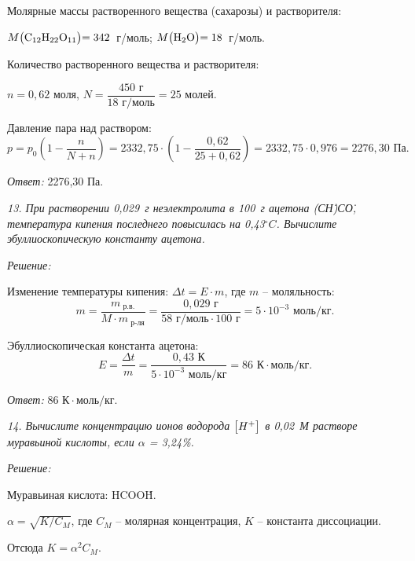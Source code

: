 Молярные массы растворенного вещества (сахарозы) и растворителя:

\( M\bigr(\mathrm{C_{12}H_{22}O_{11}}\bigl) = 342 \)~г/моль;
\( M\bigr(\mathrm{H_2O}\bigl) = 18 \)~г/моль.

Количество растворенного вещества и растворителя:

\( n = 0,\!62 \text{ моля} \), \( N = \dfrac{450\text{ г}}{18\text{ г/моль}} =
25\text{ молей} \).

Давление пара над раствором:
\[
    p = p_0\left(1 - \frac{n}{N + n}\right) = 2332,\!75\cdot\left(1 -
    \frac{0,\!62}{25 + 0,\!62}\right) = 2332,\!75\cdot 0,976 = 2276,\!30
    \text{ Па}.
\]

\vspace*{2em}
\emph{Ответ:} 2276,30 Па.

\newpage %

\emph{13. При растворении 0,029~г неэлектролита в 100~г ацетона
(С\.Н)\.С\.О, температура кипения последнего повысилась на
0,43\( ^\circ C \). Вычислите эбуллиоскопическую константу ацетона.}

\vspace*{2em}
\emph{Решение:}

Изменение температуры кипения: \( \Delta t = E\cdot m \), где \( m \) --
моляльность:
\[
    m = \frac{m_\text{ р.в.}}{M\cdot m_\text{ р-ля}} = \frac{0,\!029 \text{ г}}
    {58\text{ г/моль}\cdot 100\text{ г}} = 5 \cdot 10^{-3} \text{ моль/кг}.
\]

Эбуллиоскопическая константа ацетона:
\[
    E = \frac{\Delta t}{m} = \frac{0,\!43 \text{ К}}{5 \cdot 10^{-3}
    \text{ моль/кг}} = 86 \text{ К}\cdot\text{моль}/\text{кг}.
\]

\vspace*{2em}
\emph{Ответ:} \( 86 \text{ К}\cdot\text{моль}/\text{кг} \).

\newpage %

\emph{14. Вычислите концентрацию ионов водорода \( \bigr[H^+\bigl] \) в 0,02~М
растворе муравьиной кислоты, если \( \alpha \) = 3,24\%.}

\vspace*{2em}
\emph{Решение:}

Муравьиная кислота: HCOO\.H.

\( \alpha = \sqrt{K/C_M} \), где \( C_M \) -- молярная концентрация, \( K \) --
константа диссоциации.

Отсюда \( K = \alpha^2C_M \).

